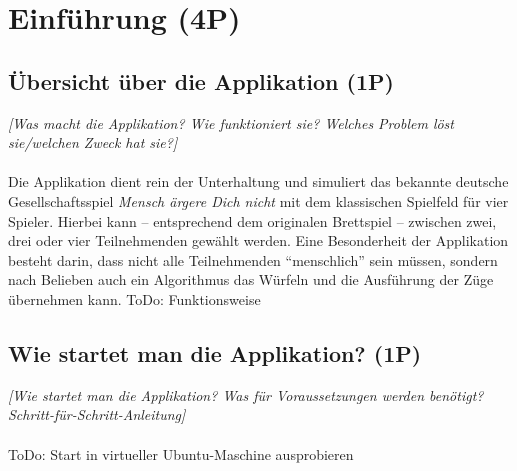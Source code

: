 
\titlespacing*{\chapter}{0pt}{-30mm}{10pt}
  
\chapter{Einführung (4P)}
\pagestyle{scrheadings}
\clearscrheadfoot
{}
\setcounter{page}{1}
\ofoot[\pagemark]{\pagemark}
\onehalfspacing

\section{Übersicht über die Applikation (1P)}
\emph{[Was macht die Applikation? Wie funktioniert sie? Welches Problem löst sie/welchen Zweck hat sie?]}
\\
\\
\noindent Die Applikation dient rein der Unterhaltung und simuliert das bekannte deutsche Gesell\-schaftsspiel \emph{Mensch ärgere Dich nicht} mit dem klassischen Spielfeld für vier Spieler. Hierbei kann -- entsprechend dem originalen Brettspiel -- zwischen zwei, drei oder vier Teilnehmenden gewählt werden. Eine Besonderheit der Applikation besteht darin, dass nicht alle Teilnehmenden \enquote{menschlich} sein müssen, sondern nach Belieben auch ein Algorithmus das Würfeln und die Ausführung der Züge übernehmen kann. ToDo: Funktionsweise

\section{Wie startet man die Applikation? (1P)}
\emph{[Wie startet man die Applikation? Was für Voraussetzungen werden benötigt? Schritt-für-Schritt-Anleitung]}
\\
\\
\noindent ToDo: Start in virtueller Ubuntu-Maschine ausprobieren

